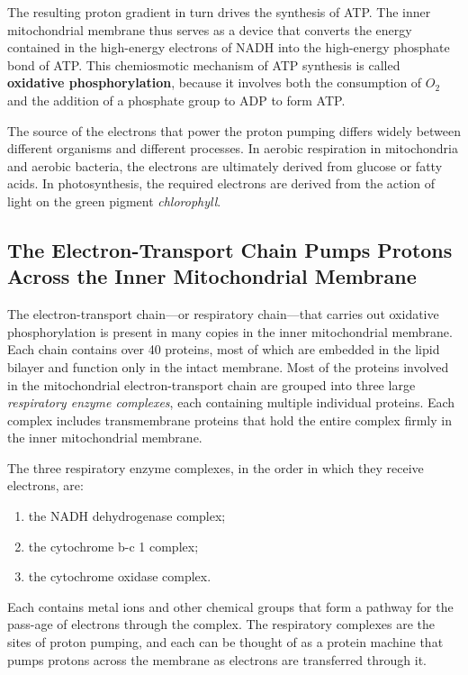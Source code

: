 The resulting proton gradient in turn drives the synthesis of ATP.
The inner mitochondrial membrane thus serves as a device that converts
the energy contained in the high-energy electrons of NADH into the
high-energy phosphate bond of ATP. This chemiosmotic mechanism of ATP synthesis
is called \textbf{oxidative phosphorylation}, because it involves both the consumption
of $O_2$ and the addition of a phosphate group to ADP to form
ATP.

The source of the electrons that power the proton pumping differs widely
between different organisms and different processes. In aerobic respiration
in mitochondria and aerobic bacteria, the electrons are ultimately
derived from glucose or fatty acids. In photosynthesis, the required
electrons are derived from the action of light on the green pigment \textit{chlorophyll}.

\subsection{The Electron-Transport Chain Pumps Protons Across the Inner Mitochondrial Membrane}

The electron-transport chain—or respiratory chain—that carries out
oxidative phosphorylation is present in many copies in the inner mitochondrial
membrane. Each chain contains over 40 proteins, most of
which are embedded in the lipid bilayer and function only in the intact
membrane. Most of the proteins involved in the mitochondrial
electron-transport chain are grouped into three large \textit{respiratory enzyme
complexes}, each containing multiple individual proteins. Each complex
includes transmembrane proteins that hold the entire complex firmly in
the inner mitochondrial membrane.

The three respiratory enzyme complexes, in the order in which they
receive electrons, are:

\begin{enumerate}
\item the NADH dehydrogenase complex;
\item the cytochrome b-c 1 complex;
\item the cytochrome oxidase complex.
\end{enumerate}

Each contains metal ions and other chemical groups that form a pathway for
the pass-age of electrons through the complex. The respiratory complexes
are the sites of proton pumping, and each can be thought of as a
protein machine that pumps protons across the membrane as electrons
are transferred through it.

